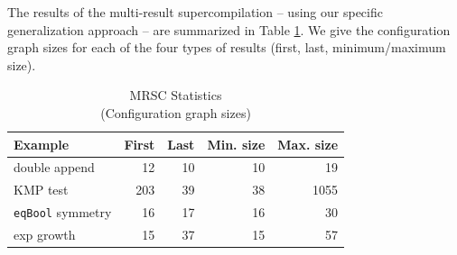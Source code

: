 \documentclass[submission,copyright,creativecommons]{eptcs}
\begin{document}
The results of the multi-result supercompilation -- using our specific generalization approach --
are summarized in Table \ref{tbl:Stats}.
We give the configuration graph sizes for each of the four types of results (first, last, minimum/maximum size).

\begin{table}
  \centering
  \caption{MRSC Statistics\\(Configuration graph sizes)}\label{tbl:Stats}
  \begin{tabular}{l|r|r|r|r}
    \hline
    Example                 & First & Last & Min. size & Max. size \\ \hline
    double append           &    12 &   10 &        10 &        19 \\
    KMP test                &   203 &   39 &        38 &      1055 \\
    \verb|eqBool| symmetry  &    16 &   17 &        16 &        30 \\
    exp growth              &    15 &   37 &        15 &        57 \\
  \end{tabular}
\end{table}
\end{document}
